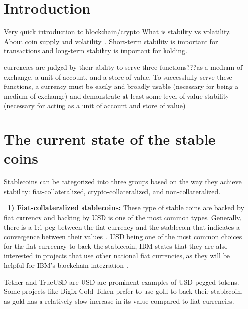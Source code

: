 \section{Introduction}
Very quick introduction to blockchain/crypto
What is stability vs volatility.
About coin supply and volatility~\cite{sams2015note}.
Short-term stability is important for transactions and long-term stability is important for holding`\cite{forbes}.


currencies are judged by their ability to serve three functions???as a medium of exchange, a unit of account, and a store of value. To successfully serve these functions, a currency must be easily and broadly usable (necessary for being a medium of exchange) and demonstrate at least some level of value stability (necessary for acting as a unit of account and store of value).


\section{The current state of the stable coins} %

Stablecoins can be categorized into three groups based on the way they achieve stability: fiat-collateralized, crypto-collateralized, and non-collateralized.


~\textbf{1) Fiat-collateralized stablecoins:} These type of stable coins are backed by fiat currency and backing by USD is one of the most common types. Generally, there is a 1:1 peg between the fiat currency and the stablecoin that indicates a convergence between their values~\cite{linkedin}. USD being one of the most common choices for the fiat currecncy to back the stablecoin, IBM states that they are also interested in projects that use other national fiat currencies, as they will be helpful for IBM's blockchain integration~\cite{cointelegraph}.


Tether and TrueUSD are USD are prominent examples of USD pegged tokens. Some projects like Digix Gold Token prefer to use gold to back their stablecoin, as gold has a relatively slow increase in its value compared to fiat currencies. %

